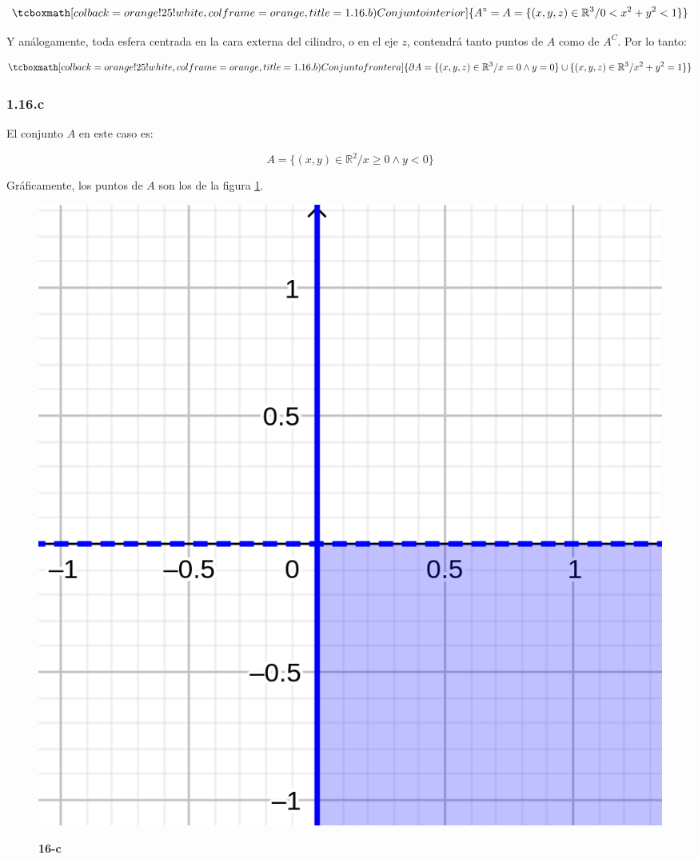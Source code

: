 \documentclass{article}
\renewcommand{\Bbb}{\mathbb}
\begin{document}
\begin{equation}
\tcboxmath[colback=orange!25!white,colframe=orange, title=1.16.b) Conjunto interior]
{ A^{\circ} = A = \{ (x, y, z) \in \Bbb R^3 / 0 < x^2 + y^2 < 1 \}  }
\end{equation}

Y análogamente, toda esfera centrada en la cara externa del cilindro, o en el eje $z$, contendrá tanto puntos de $A$ como de $A^C$. Por lo tanto:

\begin{equation}
\tcboxmath[colback=orange!25!white,colframe=orange, title=1.16.b) Conjunto frontera]
{ \partial{A} = \{(x, y, z) \in \Bbb R^3 / x = 0 \wedge y = 0 \} \cup \{ (x, y, z) \in \Bbb R^3 / x^2 + y^2 = 1 \}  }
\end{equation}

\subsubsection*{1.16.c}
\label{subsubsec:1.16.c}

El conjunto $A$ en este caso es:

\begin{equation}
A = \{ (x,y) \in \Bbb R^2 / x \geq 0 \wedge y < 0 \}
\end{equation}

Gráficamente, los puntos de $A$ son los de la figura \ref{fig:1-16-c}.

\begin{figure}[ht]
\caption{\textbf{16-c}}
\includegraphics[scale=2.5]{img/ejercicios/1/16-c.png} 
\centering
\label{fig:1-16-c}
\end{figure}
\end{document}
